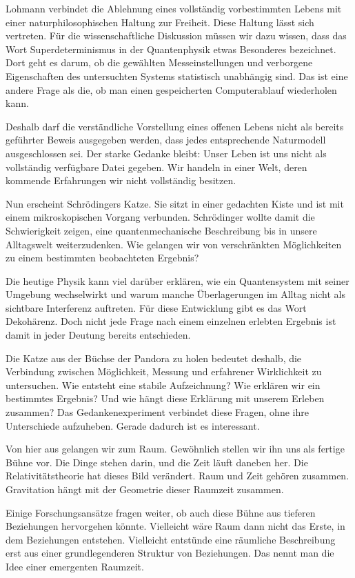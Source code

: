 Lohmann verbindet die Ablehnung eines vollständig vorbestimmten Lebens mit einer naturphilosophischen Haltung zur Freiheit. Diese Haltung lässt sich vertreten. Für die wissenschaftliche Diskussion müssen wir dazu wissen, dass das Wort Superdeterminismus in der Quantenphysik etwas Besonderes bezeichnet. Dort geht es darum, ob die gewählten Messeinstellungen und verborgene Eigenschaften des untersuchten Systems statistisch unabhängig sind. Das ist eine andere Frage als die, ob man einen gespeicherten Computerablauf wiederholen kann.

Deshalb darf die verständliche Vorstellung eines offenen Lebens nicht als bereits geführter Beweis ausgegeben werden, dass jedes entsprechende Naturmodell ausgeschlossen sei. Der starke Gedanke bleibt: Unser Leben ist uns nicht als vollständig verfügbare Datei gegeben. Wir handeln in einer Welt, deren kommende Erfahrungen wir nicht vollständig besitzen.

Nun erscheint Schrödingers Katze. Sie sitzt in einer gedachten Kiste und ist mit einem mikroskopischen Vorgang verbunden. Schrödinger wollte damit die Schwierigkeit zeigen, eine quantenmechanische Beschreibung bis in unsere Alltagswelt weiterzudenken. Wie gelangen wir von verschränkten Möglichkeiten zu einem bestimmten beobachteten Ergebnis?

Die heutige Physik kann viel darüber erklären, wie ein Quantensystem mit seiner Umgebung wechselwirkt und warum manche Überlagerungen im Alltag nicht als sichtbare Interferenz auftreten. Für diese Entwicklung gibt es das Wort Dekohärenz. Doch nicht jede Frage nach einem einzelnen erlebten Ergebnis ist damit in jeder Deutung bereits entschieden.

Die Katze aus der Büchse der Pandora zu holen bedeutet deshalb, die Verbindung zwischen Möglichkeit, Messung und erfahrener Wirklichkeit zu untersuchen. Wie entsteht eine stabile Aufzeichnung? Wie erklären wir ein bestimmtes Ergebnis? Und wie hängt diese Erklärung mit unserem Erleben zusammen? Das Gedankenexperiment verbindet diese Fragen, ohne ihre Unterschiede aufzuheben. Gerade dadurch ist es interessant.

Von hier aus gelangen wir zum Raum. Gewöhnlich stellen wir ihn uns als fertige Bühne vor. Die Dinge stehen darin, und die Zeit läuft daneben her. Die Relativitätstheorie hat dieses Bild verändert. Raum und Zeit gehören zusammen. Gravitation hängt mit der Geometrie dieser Raumzeit zusammen.

Einige Forschungsansätze fragen weiter, ob auch diese Bühne aus tieferen Beziehungen hervorgehen könnte. Vielleicht wäre Raum dann nicht das Erste, in dem Beziehungen entstehen. Vielleicht entstünde eine räumliche Beschreibung erst aus einer grundlegenderen Struktur von Beziehungen. Das nennt man die Idee einer emergenten Raumzeit.

